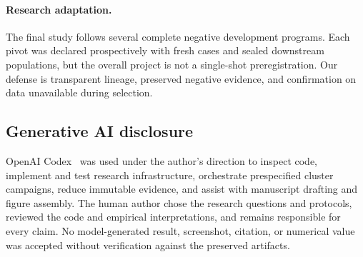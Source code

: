 \paragraph{Research adaptation.}
The final study follows several complete negative development programs. Each
pivot was declared prospectively with fresh cases and sealed downstream
populations, but the overall project is not a single-shot preregistration.
Our defense is transparent lineage, preserved negative evidence, and
confirmation on data unavailable during selection.

\subsection{Generative AI disclosure}

OpenAI Codex~\cite{openai2026codex} was used under the author's direction to
inspect code, implement
and test research infrastructure, orchestrate prespecified cluster campaigns,
reduce immutable evidence, and assist with manuscript drafting and figure
assembly. The human author chose the research questions and protocols, reviewed
the code and empirical interpretations, and remains responsible for every
claim. No model-generated result, screenshot, citation, or numerical value was
accepted without verification against the preserved artifacts.
